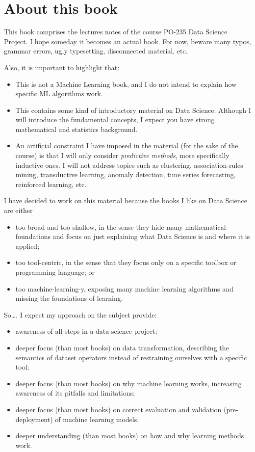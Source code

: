 \chapter*{About this book}

This book comprises the lectures notes of the course PO-235 Data Science Project.
I hope someday it becomes an actual book. For now, beware many typos, grammar errors, ugly
typesetting, disconnected material, etc.

Also, it is important to highlight that:
\begin{itemize}
  \item This is not a Machine Learning book, and I do not intend to explain how specific
    ML algorithms work.
  \item This contains some kind of introductory material on Data Science.  Although I will
    introduce the fundamental concepts, I expect you have strong mathematical and
    statistics background.
  \item An artificial constraint I have imposed in the material (for the sake of the
    course) is that I will only consider \emph{predictive methods}, more specifically
    inductive ones. I will not address topics such as clustering, association-rules
    mining, transductive learning, anomaly detection, time series forecasting, reinforced
    learning, etc.
\end{itemize}

I have decided to work on this material because the books I like on Data Science are
either
\begin{itemize}
  \item too broad and too shallow, in the sense they hide many mathematical foundations
    and focus on just explaining what Data Science is and where it is applied;
  \item too tool-centric, in the sense that they focus only on a specific toolbox or
    programming language; or
  \item too machine-learning-y, exposing many machine learning algorithms and missing the
    foundations of learning.
\end{itemize}

So\dots, I expect my approach on the subject provide:
\begin{itemize}
  \item awareness of all steps in a data science project;
  \item deeper focus (than most books) on data transformation, describing the semantics of dataset
    operators instead of restraining ourselves with a specific tool;
  \item deeper focus (than most books) on why machine learning works, increasing awareness of its pitfalls and
    limitations;
  \item deeper focus (than most books) on correct evaluation and validation
    (pre-deployment) of machine learning models.
  \item deeper understanding (than most books) on how and why learning methods work.
\end{itemize}

